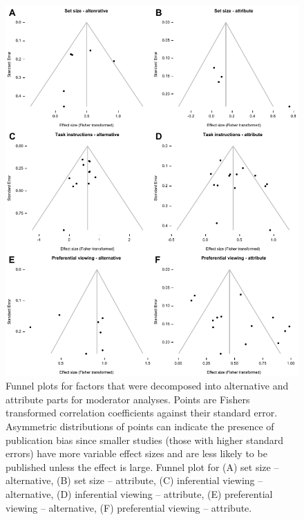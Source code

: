 \documentclass[english,natbib,man,floatsintext]{apa6}
\begin{document}
\begin{figure}%
\includegraphics{funnel_plots_altatt}
\centering
\singlespace
\caption{Funnel plots for factors that were decomposed into alternative and attribute parts for moderator analyses. Points are Fishers transformed correlation coefficients against their standard error. Asymmetric distributions of points can indicate the presence of publication bias since smaller studies (those with higher standard errors) have more variable effect sizes and are less likely to be published unless the effect is large. Funnel plot for (A) set size -- alternative, (B) set size -- attribute, (C) inferential viewing -- alternative, (D) inferential viewing -- attribute, (E) preferential viewing -- alternative, (F) preferential viewing -- attribute.}
\label{fig:funnel_plots_altatt}
\end{figure}
\clearpage
\end{document}
